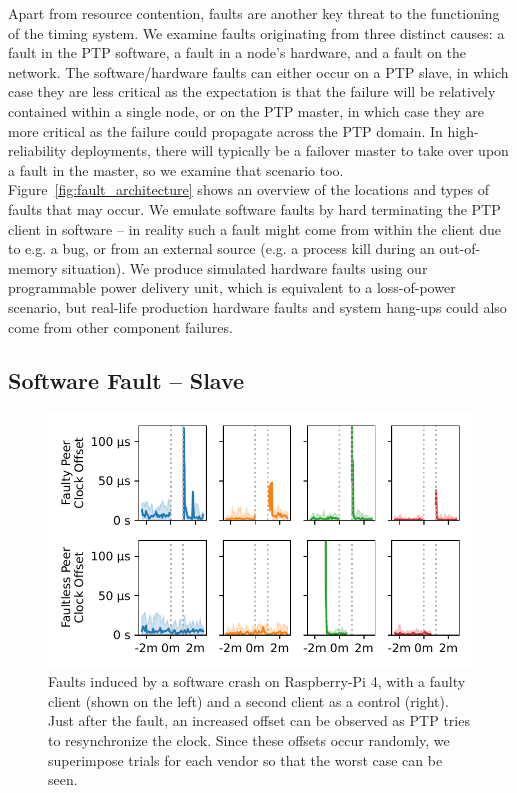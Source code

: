 Apart from resource contention, faults are another key threat to the functioning of the timing system. We examine faults originating from three distinct causes: a fault in the PTP software, a fault in a node's hardware, and a fault on the network. The software/hardware faults can either occur on a PTP slave, in which case they are less critical as the expectation is that the failure will be relatively contained within a single node, or on the PTP master, in which case they are more critical as the failure could propagate across the PTP domain. In high-reliability deployments, there will typically be a failover master to take over upon a fault in the master, so we examine that scenario too. Figure~\ref{fig:fault_architecture} shows an overview of the locations and types of faults that may occur. We emulate software faults by hard terminating the PTP client in software -- in reality such a fault might come from within the client due to e.g. a bug, or from an external source (e.g. a process kill during an out-of-memory situation). We produce simulated hardware faults using our programmable power delivery unit, which is equivalent to a loss-of-power scenario, but real-life production hardware faults and system hang-ups could also come from other component failures.

\subsection{Software Fault -- Slave}

\xdef\bSoftwareFaultNumProfiles{\cmpMax}
\newcommand{\maxClockSlew}{(0.05/100)}
\newcommand{\windowOfUncertaintyOneMinute}{(60*(\maxClockSlew))}

\begin{figure}
    \centering
    \includegraphics[width=\linewidth]{res/generated/fault/software/slave_rpi-4_peer_comparison.pdf}
    \legend
    \caption{Faults induced by a software crash on Raspberry-Pi 4, with a faulty client (shown on the left) and a second client as a control (right). Just after the fault, an increased offset can be observed as PTP tries to resynchronize the clock. Since these offsets occur randomly, we superimpose \fNum{\bSoftwareFaultNumProfiles} trials for each vendor so that the worst case can be seen.}
    \label{fig:software_fault}
\end{figure}

